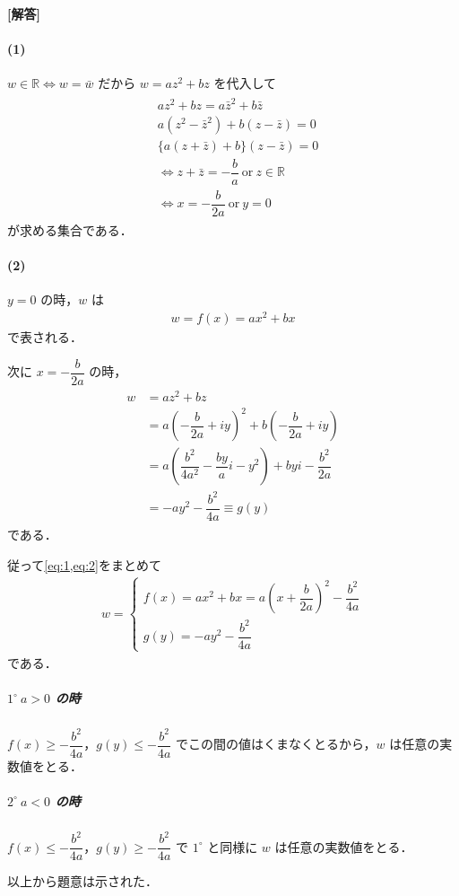 \documentclass[../../main.tex]{subfiles}
\begin{document}
\begin{oframed}
  
\end{oframed}

{\bf [解答]}

\paragraph{(1)}

$w\in\mathbb{R} \iff w=\bar w$ だから $w=az^2+bz$ を代入して
\begin{align}
  \begin{split}
    & az^2+bz=a\bar z^2+b\bar z \\
    & a(z^2-\bar z^2)+b(z-\bar z)=0 \\
    & \{a(z+\bar z)+b\}(z-\bar z)=0 \\
    &\iff z+\bar z=-\dfrac{b}{a}\ \text{or}\ z\in\mathbb{R} \\
    &\iff x=-\dfrac{b}{2a}\ \text{or}\ y=0
  \end{split}
\end{align}
が求める集合である．

\paragraph{(2)}

$y=0$ の時，$w$ は
\begin{align}
  w = f(x)=ax^2+bx \label{eq:1}
\end{align}
で表される．

次に $x=-\dfrac{b}{2a}$ の時，
\begin{align}
  \begin{split}
    w &= az^2+bz \\
    &= a\left(-\dfrac{b}{2a}+iy\right)^2+b\left(-\dfrac{b}{2a}+iy\right) \\
    &= a\left(\dfrac{b^2}{4a^2}-\dfrac{by}{a}i-y^2\right)+byi-\dfrac{b^2}{2a} \\
    &= -ay^2-\dfrac{b^2}{4a} \equiv g(y) \label{eq:2}
  \end{split}
\end{align}
である．

従って\cref{eq:1,eq:2}をまとめて
\begin{align}
  w =
  \begin{cases}
    f(x) = ax^2+bx = a\left(x+\dfrac{b}{2a}\right)^2 - \dfrac{b^2}{4a}\\
    g(y) = -ay^2-\dfrac{b^2}{4a}
  \end{cases}
\end{align}
である．

\subparagraph{$1^\circ\ a>0$ の時}

$f(x)\ge-\dfrac{b^2}{4a}$，$g(y)\le-\dfrac{b^2}{4a}$ でこの間の値はくまなくとるから，$w$ は任意の実数値をとる．

\subparagraph{$2^\circ\ a<0$ の時}

$f(x)\le-\dfrac{b^2}{4a}$，$g(y)\ge-\dfrac{b^2}{4a}$ で $1^\circ$ と同様に $w$ は任意の実数値をとる．
\casesend

以上から題意は示された．

\newpage
\end{document}
